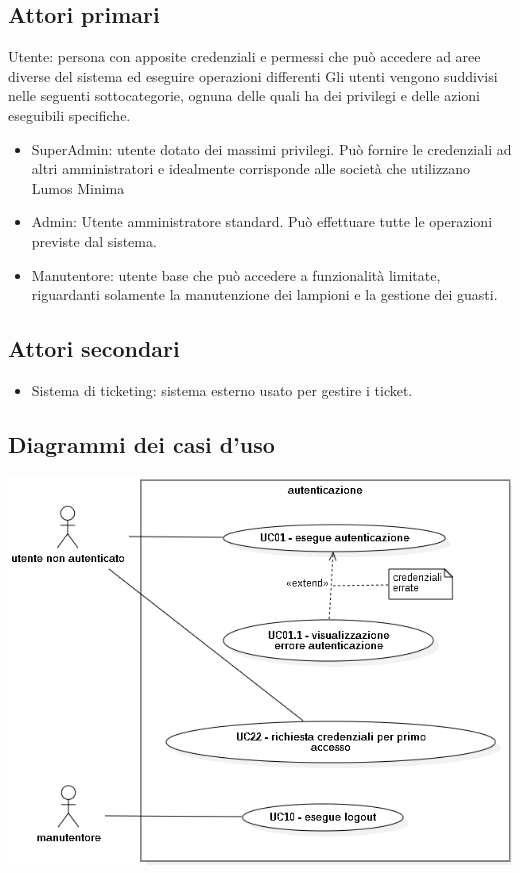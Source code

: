 \documentclass[12pt]{article}
\begin{document}
\subsection{Attori primari}
Utente: persona con apposite credenziali e permessi che può accedere ad aree diverse del sistema ed eseguire operazioni differenti
Gli utenti vengono suddivisi nelle seguenti sottocategorie, ognuna delle quali ha dei privilegi e delle azioni eseguibili specifiche.
\begin{itemize}
	\item SuperAdmin: utente dotato dei massimi privilegi. Può fornire le credenziali ad altri amministratori e idealmente corrisponde alle società che utilizzano Lumos Minima
	\item Admin: Utente amministratore standard. Può effettuare tutte le operazioni previste dal sistema.
	\item Manutentore: utente base che può accedere a funzionalità limitate, riguardanti solamente la manutenzione dei lampioni e la gestione dei guasti.
\end{itemize}

\subsection{Attori secondari}
\begin{itemize}
	\item Sistema di ticketing: sistema esterno usato per gestire i ticket.
\end{itemize}

\subsection{Diagrammi dei casi d'uso}

\includegraphics[scale=0.5]{autenticazione.png}
\end{document}
